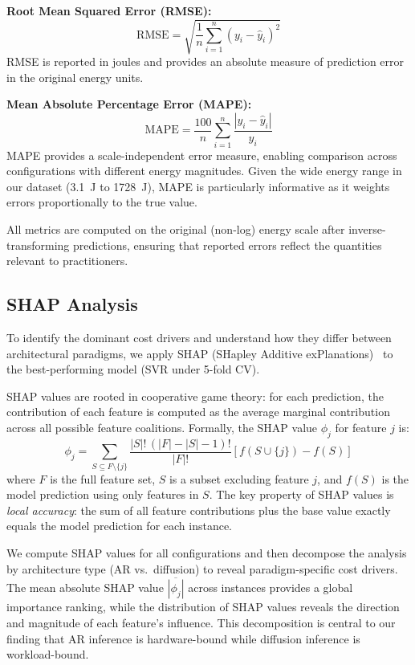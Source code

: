 \documentclass[preprint,review,12pt]{elsarticle}
\begin{document}
\textbf{Root Mean Squared Error (RMSE):}
\begin{equation}
\text{RMSE} = \sqrt{\frac{1}{n}\sum_{i=1}^{n}(y_i - \hat{y}_i)^2}
\label{eq:rmse}
\end{equation}
RMSE is reported in joules and provides an absolute measure of prediction error in the original energy units.

\textbf{Mean Absolute Percentage Error (MAPE):}
\begin{equation}
\text{MAPE} = \frac{100}{n}\sum_{i=1}^{n}\frac{|y_i - \hat{y}_i|}{y_i}
\label{eq:mape}
\end{equation}
MAPE provides a scale-independent error measure, enabling comparison across configurations with different energy magnitudes.
Given the wide energy range in our dataset (\SI{3.1}{\joule} to \SI{1728}{\joule}), MAPE is particularly informative as it weights errors proportionally to the true value.

All metrics are computed on the original (non-log) energy scale after inverse-transforming predictions, ensuring that reported errors reflect the quantities relevant to practitioners.

\subsection{SHAP Analysis}
\label{sec:shap_method}
To identify the dominant cost drivers and understand how they differ between architectural paradigms, we apply SHAP (SHapley Additive exPlanations)~\cite{lundberg2017shap} to the best-performing model (SVR under 5-fold CV).

SHAP values are rooted in cooperative game theory: for each prediction, the contribution of each feature is computed as the average marginal contribution across all possible feature coalitions.
Formally, the SHAP value $\phi_j$ for feature $j$ is:
\begin{equation}
\phi_j = \sum_{S \subseteq F \setminus \{j\}} \frac{|S|!\,(|F|-|S|-1)!}{|F|!} \left[ f(S \cup \{j\}) - f(S) \right]
\label{eq:shap}
\end{equation}
where $F$ is the full feature set, $S$ is a subset excluding feature $j$, and $f(S)$ is the model prediction using only features in $S$.
The key property of SHAP values is \emph{local accuracy}: the sum of all feature contributions plus the base value exactly equals the model prediction for each instance.

We compute SHAP values for all configurations and then decompose the analysis by architecture type (AR vs.\ diffusion) to reveal paradigm-specific cost drivers.
The mean absolute SHAP value $\overline{|\phi_j|}$ across instances provides a global importance ranking, while the distribution of SHAP values reveals the direction and magnitude of each feature's influence.
This decomposition is central to our finding that AR inference is hardware-bound while diffusion inference is workload-bound.
\end{document}
